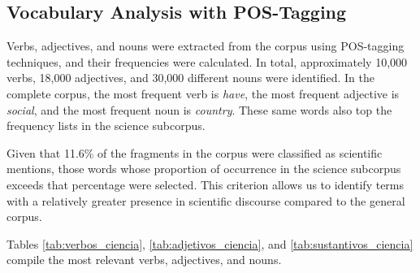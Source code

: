 \documentclass[pdflatex,sn-mathphys-num, iicol]{sn-jnl}
\begin{document}
	\subsection{Vocabulary Analysis with POS-Tagging}\label{subsec:pos_results}
	
	Verbs, adjectives, and nouns were extracted from the corpus using POS-tagging techniques, and their frequencies were calculated. In total, approximately 10,000 verbs, 18,000 adjectives, and 30,000 different nouns were identified. In the complete corpus, the most frequent verb is \textit{have}, the most frequent adjective is \textit{social}, and the most frequent noun is \textit{country}. These same words also top the frequency lists in the science subcorpus.
	
	Given that 11.6\% of the fragments in the corpus were classified as scientific mentions, those words whose proportion of occurrence in the science subcorpus exceeds that percentage were selected. This criterion allows us to identify terms with a relatively greater presence in scientific discourse compared to the general corpus.
	
	Tables \ref{tab:verbos_ciencia}, \ref{tab:adjetivos_ciencia}, and \ref{tab:sustantivos_ciencia} compile the most relevant verbs, adjectives, and nouns.
	
\end{document}
